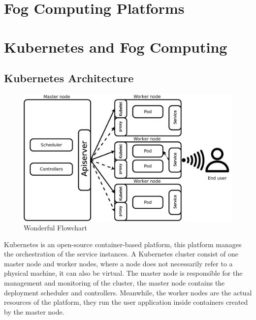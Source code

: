 \documentclass[letterpaper,twocolumn,10pt]{article}
\begin{document}
\section{Fog Computing Platforms}\label{plat}
\lipsum[20]
\section{Kubernetes and Fog Computing}\label{kube}

\subsection{Kubernetes Architecture}

\begin{figure}[th]
\begin{center}
\includegraphics[width=\textwidth/2]{images/arch.png}
\end{center}
\caption{Wonderful Flowchart}
\end{figure}

Kubernetes is an open-source container-based platform, this platform manages the orchestration of the service instances. A Kubernetes cluster consist of one master node and worker nodes, where a node does not necessarily refer to a physical machine, it can also be virtual. The master node is responsible for the management and monitoring of the cluster, the master node contains the deployment scheduler and controllers.  Meanwhile, the worker nodes are the actual resources of the platform, they run the user application inside containers created by the master node. 
\end{document}
